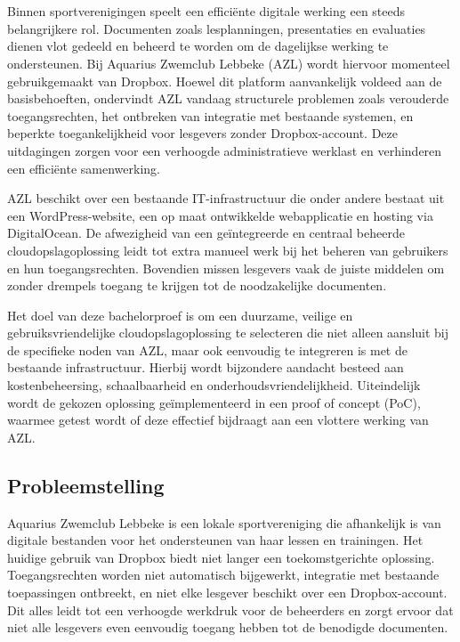 
\chapter{}%
\label{ch:inleiding}

Binnen sportverenigingen speelt een efficiënte digitale werking een steeds belangrijkere rol. Documenten zoals lesplanningen, presentaties en evaluaties dienen vlot gedeeld en beheerd te worden om de dagelijkse werking te ondersteunen. Bij Aquarius Zwemclub Lebbeke (AZL) wordt hiervoor momenteel gebruikgemaakt van Dropbox. Hoewel dit platform aanvankelijk voldeed aan de basisbehoeften, ondervindt AZL vandaag structurele problemen zoals verouderde toegangsrechten, het ontbreken van integratie met bestaande systemen, en beperkte toegankelijkheid voor lesgevers zonder Dropbox-account. Deze uitdagingen zorgen voor een verhoogde administratieve werklast en verhinderen een efficiënte samenwerking.

AZL beschikt over een bestaande IT-infrastructuur die onder andere bestaat uit een WordPress-website, een op maat ontwikkelde webapplicatie en hosting via DigitalOcean. De afwezigheid van een geïntegreerde en centraal beheerde cloudopslagoplossing leidt tot extra manueel werk bij het beheren van gebruikers en hun toegangsrechten. Bovendien missen lesgevers vaak de juiste middelen om zonder drempels toegang te krijgen tot de noodzakelijke documenten. 

Het doel van deze bachelorproef is om een duurzame, veilige en gebruiksvriendelijke cloudopslagoplossing te selecteren die niet alleen aansluit bij de specifieke noden van AZL, maar ook eenvoudig te integreren is met de bestaande infrastructuur. Hierbij wordt bijzondere aandacht besteed aan kostenbeheersing, schaalbaarheid en onderhoudsvriendelijkheid. Uiteindelijk wordt de gekozen oplossing geïmplementeerd in een proof of concept (PoC), waarmee getest wordt of deze effectief bijdraagt aan een vlottere werking van AZL.

\section{Probleemstelling}%
\label{sec:probleemstelling}

Aquarius Zwemclub Lebbeke is een lokale sportvereniging die afhankelijk is van digitale bestanden voor het ondersteunen van haar lessen en trainingen. Het huidige gebruik van Dropbox biedt niet langer een toekomstgerichte oplossing. Toegangsrechten worden niet automatisch bijgewerkt, integratie met bestaande toepassingen ontbreekt, en niet elke lesgever beschikt over een Dropbox-account. Dit alles leidt tot een verhoogde werkdruk voor de beheerders en zorgt ervoor dat niet alle lesgevers even eenvoudig toegang hebben tot de benodigde documenten.

